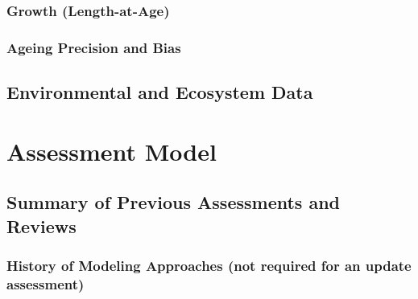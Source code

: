 \documentclass[11pt,
  english,
  a4paper,
]{article}
\begin{document}

\hypertarget{growth-length-at-age}{%
\subsubsection{Growth (Length-at-Age)}\label{growth-length-at-age}}

\leavevmode\tagmcend\tagstructend


\hypertarget{ageing-precision-and-bias}{%
\subsubsection{Ageing Precision and Bias}\label{ageing-precision-and-bias}}

\leavevmode\tagmcend\tagstructend


\hypertarget{environmental-and-ecosystem-data}{%
\subsection{Environmental and Ecosystem Data}\label{environmental-and-ecosystem-data}}

\leavevmode\tagmcend\tagstructend


\hypertarget{assessment-model}{%
\section{Assessment Model}\label{assessment-model}}

\leavevmode\tagmcend\tagstructend


\hypertarget{summary-of-previous-assessments-and-reviews}{%
\subsection{Summary of Previous Assessments and Reviews}\label{summary-of-previous-assessments-and-reviews}}

\leavevmode\tagmcend\tagstructend


\hypertarget{history-of-modeling-approaches-not-required-for-an-update-assessment}{%
\subsubsection{History of Modeling Approaches (not required for an update assessment)}\label{history-of-modeling-approaches-not-required-for-an-update-assessment}}
\end{document}
